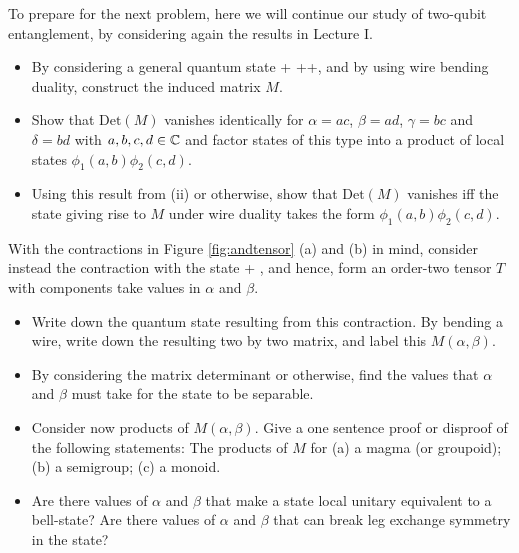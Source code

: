 \begin{myexercise}
To prepare for the next problem, here we will continue our study of two-qubit entanglement, by considering again the results in Lecture I.  
 \begin{itemize}
 \item[(i)] By considering a general quantum state
 \be 
 \alpha {} + \beta{}+\gamma{}+\delta{},
 \ee  
and by using wire bending duality, construct the induced matrix $M$. 
  \item[(ii)]  Show that $\text{Det}(M)$ vanishes identically for $\alpha = ac$, $\beta = ad$, $\gamma = bc$ and $\delta = bd$ with $a,b,c,d\in {\mathbb C}$ and factor states of this type into a product of local states $\phi_1(a,b)\phi_2(c,d)$.  
  \item[(ii)] Using this result from (ii) or otherwise, show that $\text{Det}(M)$ vanishes iff the state giving rise to $M$ under wire duality takes the form $\phi_1(a,b)\phi_2(c,d)$.
 \end{itemize}
\end{myexercise}


\begin{myexercise} 
With the contractions in Figure \ref{fig:andtensor} (a) and (b) in mind, consider instead the contraction with the state 
\be 
\alpha{} + \beta{},
\ee 
and hence, form an order-two tensor $T$ with components take values in $\alpha$ and $\beta$.  
\begin{itemize}
 \item[(i)] Write down the quantum state resulting from this contraction.  By bending a wire, write down the resulting two by two matrix, and label this $M(\alpha, \beta)$.  
 \item[(ii)] By considering the matrix determinant or otherwise, find the values 
 that $\alpha$ and $\beta$ must take for the state to be separable. 
 \item[(iii)] Consider now products of $M(\alpha, \beta)$.  Give a one sentence proof or disproof of the following statements:  The products of $M$ for (a) a magma (or groupoid); (b) a semigroup; (c) a monoid.  
 \item[(iv)] Are there values of $\alpha$ and $\beta$ that make a state local unitary equivalent to a bell-state? Are there values of $\alpha$ and $\beta$ that can break leg exchange symmetry in the state? 
\end{itemize}
\end{myexercise}  



